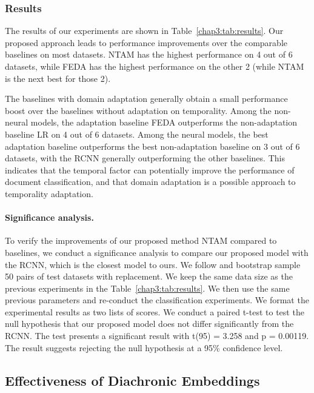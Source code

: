 \subsubsection{Results}
\label{chap3:sec:results}


The results of our experiments are shown in Table~\ref{chap3:tab:results}. 
Our proposed approach leads to performance improvements over the comparable baselines on most datasets.
NTAM has the highest performance on 4 out of 6 datasets, while FEDA has the highest performance on the other 2 (while NTAM is the next best for those 2).


The baselines with domain adaptation generally obtain a small performance boost over the baselines without adaptation on temporality. 
Among the non-neural models, the adaptation baseline FEDA outperforms the non-adaptation baseline LR on 4 out of 6 datasets. 
Among the neural models, the best adaptation baseline outperforms the best non-adaptation baseline on 3 out of 6 datasets,
with the RCNN generally outperforming the other baselines.
This indicates that the temporal factor can potentially improve the performance of document classification, and that domain adaptation is a possible approach to temporality adaptation. 

\paragraph{Significance analysis.} 
To verify the improvements of our proposed method NTAM compared to baselines, we conduct a significance analysis to compare our proposed model with the RCNN, which is the closest model to ours. We follow \cite{berg2012empirical} and bootstrap sample 50 pairs of test datasets with replacement. We keep the same data size as the previous experiments in the Table~\ref{chap3:tab:results}. We then use the same previous parameters and re-conduct the classification experiments. We format the experimental results as two lists of scores. We conduct a paired t-test to test the null hypothesis that our proposed model does not differ significantly from the RCNN. The test presents a significant result with t(95) = 3.258 and p = 0.00119. The result suggests rejecting the null hypothesis at a 95\% confidence level.


\subsection{Effectiveness of Diachronic Embeddings}

